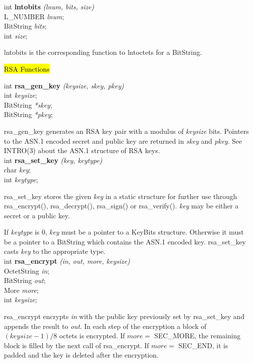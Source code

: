 int {\bf lntobits} {\em (lnum, bits, size)} \\
L\_NUMBER {\em *lnum}; \\
BitString {\em *bits};\\
int {\em size}; 

lntobits is the corresponding function to lntoctets for a BitString.


\hl{RSA Functions}

int {\bf rsa\_gen\_key} {\em (keysize, skey, pkey)} \\
int {\em keysize}; \\
BitString {\em **skey}; \\
BitString {\em **pkey}; 

rsa\_gen\_key generates an RSA key pair with a modulus of {\em keysize} bits.
Pointers to the ASN.1 encoded secret and public key are returned in {\em *skey} and {\em *pkey}.
See INTRO(3) about the ASN.1 structure of RSA keys. 
\\ [1ex]



int {\bf rsa\_set\_key} {\em (key, keytype)} \\
char {\em *key}; \\
int {\em keytype}; 

rsa\_set\_key stores the given {\em key} in a static
structure for further use through rsa\_encrypt(), rsa\_decrypt(),
rsa\_sign() or rsa\_verify(). {\em key} may be either a secret or a public key.

If {\em keytype} is 0, {\em key} must be a pointer to a KeyBits structure.
Otherwise it must be a pointer to a BitString which contains the ASN.1 
encoded key. rsa\_set\_key casts {\em key} to the appropriate type.
\\ [1ex]


int {\bf rsa\_encrypt} {\em (in, out, more, keysize)} \\
OctetString {\em *in}; \\
BitString {\em *out}; \\
More {\em more}; \\
int {\em keysize}; 

rsa\_encrypt encrypts {\em in} with the public key previously 
set by rsa\_set\_key and appends the result
to {\em out}. In each step of the encryption a block of
$(keysize-1) / 8$ octets is encrypted. If $more =$ SEC\_MORE,
the remaining block is filled by the next call of  rsa\_encrypt.
If $more =$ SEC\_END, it is padded and the key is deleted
after the encryption.
\\ [1ex]


